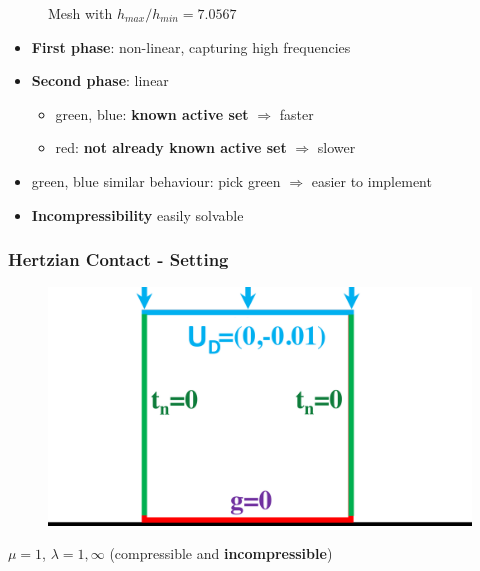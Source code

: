 \documentclass[8pt, oneside]{beamer}   	%
\newcommand{\colb}{\color{myblue}}
\newcommand{\colg}{\color{mygreen}}
\newcommand{\colo}{\color{orange}}
\newcommand{\titlecolor}[1]{\frametitle{\textcolor{dkgrey}{ \textbf{#1}}}}
\begin{document}
\begin{frame}
\begin{figure}[htbp!]
	\caption{Mesh with $h_{max}/h_{min}=7.0567$}
		\label{ResidualRateVeryNonUniform}
\end{figure}
\begin{itemize}
\item \textbf{First phase}: non-linear, capturing high frequencies
\item \textbf{Second phase}: linear
\begin{itemize}
\item {\colg green},  {\colb blue}: \textbf{known active set }$\Rightarrow$ faster
\item {\colo red}: \textbf{not already known active set }$\Rightarrow$ slower
\end{itemize}
\item {\colg green},  {\colb blue} similar behaviour: pick {\colg green} $\Rightarrow$ easier to implement 
\item \textbf{Incompressibility} easily solvable
\end{itemize}
\end{frame}


\begin{frame}
\titlecolor{Hertzian Contact - Setting}
\begin{figure}[htbp!]
\includegraphics[scale=0.2]{img/signorinisquare.pdf} 
\end{figure}
$ \mu = 1$, $ \lambda = 1, \infty$ (compressible and \textbf{incompressible})
\end{frame}
\end{document}
